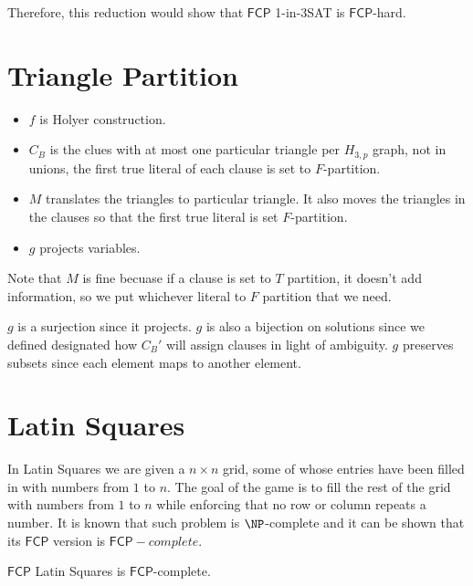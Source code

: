 \documentclass[runningheads,a4paper]{llncs}
\begin{document}
Therefore, this reduction would show that $\mathsf{FCP}$ 1-in-3SAT is $\mathsf{FCP}$-hard. 

\section{Triangle Partition}

\begin{itemize}
\item $f$ is Holyer construction.
\item $C_B$ is the clues with at most one particular triangle per $H_{3,p}$ graph, not in unions, the first true literal of each clause is set to $F$-partition. 
\item $M$ translates the triangles to particular triangle. It also moves the triangles in the clauses so that the first true literal is set $F$-partition.
\item $g$ projects variables. 
\end{itemize}

Note that $M$ is fine becuase if a clause is set to $T$ partition, it doesn't add information, so we put whichever literal to $F$ partition that we need. 

$g$ is a surjection since it projects. $g$ is also a bijection on solutions since we defined designated how $C_B'$ will assign clauses in light of ambiguity. $g$ preserves subsets since each element maps to another element. 

\section{Latin Squares}

In Latin Squares we are given a $n \times n$ grid, some of whose entries have been filled in with numbers from $1$ to $n$. The goal of the game is to fill the rest of the grid with numbers from $1$ to $n$ while enforcing that no row or column repeats a number. It is known that such problem is $\NP$-complete and it can be shown that its $\mathsf{FCP}$ version is $\mathsf{FCP}-complete$. 

\begin{theorem}
$\mathsf{FCP}$ Latin Squares is $\mathsf{FCP}$-complete.
\end{theorem}
\end{document}
